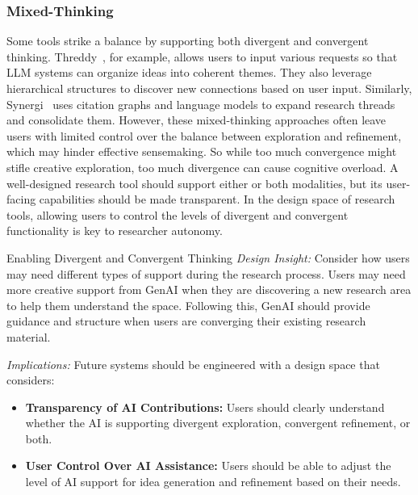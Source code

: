 \subsubsection{Mixed-Thinking}
Some tools strike a balance by supporting both divergent and convergent thinking. Threddy~\cite{threddy}, for example, allows users to input various requests so that LLM systems can organize ideas into coherent themes. They also leverage hierarchical structures to discover new connections based on user input. Similarly, Synergi~\cite{synergi} uses citation graphs and language models to expand research threads and consolidate them. However, these mixed-thinking approaches often leave users with limited control over the balance between exploration and refinement, which may hinder effective sensemaking. So while too much convergence might stifle creative exploration, too much divergence can cause cognitive overload. A well-designed research tool should support either or both modalities, but its user-facing capabilities should be made transparent. In the design space of research tools, allowing users to control the levels of divergent and convergent functionality is key to researcher autonomy.


\begin{designRecom}{Enabling Divergent and Convergent Thinking}
\textit{Design Insight:} Consider how users may need different types of support during the research process. Users may need more creative support from GenAI when they are discovering a new research area to help them understand the space. Following this, GenAI should provide guidance and structure when users are converging their existing research material.
\smallskip

\textit{Implications:} Future systems should be engineered with a design space that considers:

\begin{itemize}
\item \textbf{Transparency of AI Contributions:} Users should clearly understand whether the AI is supporting divergent exploration, convergent refinement, or both.  
\item \textbf{User Control Over AI Assistance:} Users should be able to adjust the level of AI support for idea generation and refinement based on their needs.  
\end{itemize}


\end{designRecom}


